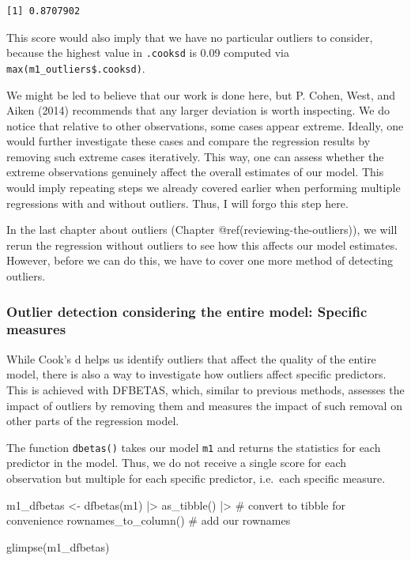 \documentclass[
  letterpaper,
]{krantz}
\makeatletter
\newenvironment{Shaded}{\begin{snugshade}}{\end{snugshade}}
\newcommand{\CommentTok}[1]{\textcolor[rgb]{0.37,0.37,0.37}{#1}}
\newcommand{\FunctionTok}[1]{\textcolor[rgb]{0.28,0.35,0.67}{#1}}
\newcommand{\NormalTok}[1]{\textcolor[rgb]{0.00,0.23,0.31}{#1}}
\newcommand{\OtherTok}[1]{\textcolor[rgb]{0.00,0.23,0.31}{#1}}
\newcommand{\SpecialCharTok}[1]{\textcolor[rgb]{0.37,0.37,0.37}{#1}}
\newenvironment{kframe}{%
\medskip{}
\setlength{\fboxsep}{.8em}
 \def\at@end@of@kframe{}%
 \ifinner\ifhmode%
  \def\at@end@of@kframe{\end{minipage}}%
  \begin{minipage}{\columnwidth}%
 \fi\fi%
 \def\FrameCommand##1{\hskip\@totalleftmargin \hskip-\fboxsep
 \colorbox{shadecolor}{##1}\hskip-\fboxsep
     \hskip-\linewidth \hskip-\@totalleftmargin \hskip\columnwidth}%
 \MakeFramed {\advance\hsize-\width
   \@totalleftmargin\z@ \linewidth\hsize
   \@setminipage}}%
 {\par\unskip\endMakeFramed%
 \at@end@of@kframe}
\renewenvironment{Shaded}{\begin{kframe}}{\end{kframe}}
\makeatother
\begin{document}
\begin{verbatim}
[1] 0.8707902
\end{verbatim}

This score would also imply that we have no particular outliers to
consider, because the highest value in \texttt{.cooksd} is 0.09 computed
via \texttt{max(m1\_outliers\$.cooksd)}.

We might be led to believe that our work is done here, but P. Cohen,
West, and Aiken (2014) recommends that any larger deviation is worth
inspecting. We do notice that relative to other observations, some cases
appear extreme. Ideally, one would further investigate these cases and
compare the regression results by removing such extreme cases
iteratively. This way, one can assess whether the extreme observations
genuinely affect the overall estimates of our model. This would imply
repeating steps we already covered earlier when performing multiple
regressions with and without outliers. Thus, I will forgo this step
here.

In the last chapter about outliers (Chapter
@ref(reviewing-the-outliers)), we will rerun the regression without
outliers to see how this affects our model estimates. However, before we
can do this, we have to cover one more method of detecting outliers.

\subsubsection{Outlier detection considering the entire model: Specific
measures}\label{sec-outlier-detection-specific-measures}

While Cook's d helps us identify outliers that affect the quality of the
entire model, there is also a way to investigate how outliers affect
specific predictors. This is achieved with DFBETAS, which, similar to
previous methods, assesses the impact of outliers by removing them and
measures the impact of such removal on other parts of the regression
model.

The function \texttt{dbetas()} takes our model \texttt{m1} and returns
the statistics for each predictor in the model. Thus, we do not receive
a single score for each observation but multiple for each specific
predictor, i.e.~each specific measure.

\begin{Shaded}
\begin{Highlighting}[]
\NormalTok{m1\_dfbetas }\OtherTok{\textless{}{-}}
  \FunctionTok{dfbetas}\NormalTok{(m1) }\SpecialCharTok{|\textgreater{}}
  \FunctionTok{as\_tibble}\NormalTok{() }\SpecialCharTok{|\textgreater{}}               \CommentTok{\# convert to tibble for convenience}
  \FunctionTok{rownames\_to\_column}\NormalTok{()          }\CommentTok{\# add our rownames}

\FunctionTok{glimpse}\NormalTok{(m1\_dfbetas)}
\end{Highlighting}
\end{Shaded}
\end{document}
